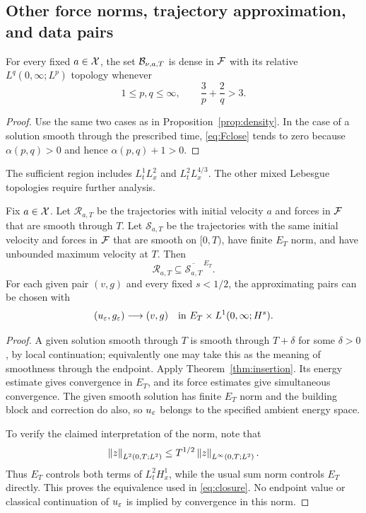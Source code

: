 \subsection{Other force norms, trajectory approximation, and data pairs}
\begin{corollary}\label{cor:mixed}
For every fixed $a\in\mathcal X$, the set $\mathcal B_{\nu,a,T}$ is dense in $\mathcal F$ with its relative $L^q(0,\infty;L^p)$ topology whenever
\begin{equation}\label{eq:mixedregion}
 1\le p,q\le\infty,\qquad \frac3p+\frac2q>3.
\end{equation}
\end{corollary}
\begin{proof}
Use the same two cases as in Proposition~\ref{prop:density}. In the case of a solution smooth through the prescribed time, \eqref{eq:Fclose} tends to zero because
$\alpha(p,q)>0$ and hence $\alpha(p,q)+1>0$.
\end{proof}
The sufficient region includes $L^1_tL^2_x$ and $L^2_tL^{4/3}_x$. The other mixed Lebesgue topologies require further analysis.

\begin{corollary}\label{cor:closure}
Fix $a\in\mathcal X$. Let $\mathcal R_{a,T}$ be the trajectories with initial velocity $a$ and forces in $\mathcal F$ that are smooth through $T$.
Let $\mathcal S_{a,T}$ be the trajectories with the same initial velocity and forces in $\mathcal F$ that are smooth on $[0,T)$, have finite $E_T$ norm, and have unbounded maximum velocity at $T$. Then
\begin{equation}\label{eq:closure}
 \mathcal R_{a,T}\subseteq\overline{\mathcal S_{a,T}}^{\,E_T}.
\end{equation}
For each given pair $(v,g)$ and every fixed $s<1/2$, the approximating pairs can be chosen with
\[
 (u_\varepsilon,g_\varepsilon)\longrightarrow(v,g)
 \quad\hbox{in }E_T\times L^1(0,\infty;H^s).
\]
\end{corollary}
\begin{proof}
A given solution smooth through $T$ is smooth through $T+\delta$ for some
$\delta>0$, by local continuation; equivalently one may take this as the meaning of smoothness through the endpoint. Apply Theorem~\ref{thm:insertion}. Its energy estimate gives convergence in $E_T$, and its force estimates give simultaneous convergence. The given smooth solution has finite $E_T$ norm and the building block and correction do also, so $u_\varepsilon$ belongs to the specified ambient energy space.

To verify the claimed interpretation of the norm, note that
\[
 \left\lVert z\right\rVert_{L^2(0,T;L^2)}
 \le T^{1/2}\left\lVert z\right\rVert_{L^\infty(0,T;L^2)}.
\]
Thus $E_T$ controls both terms of $L^2_tH^1_x$, while the usual sum norm controls $E_T$ directly. This proves the equivalence used in \eqref{eq:closure}. No endpoint value or classical continuation of $u_\varepsilon$ is implied by convergence in this norm.
\end{proof}

